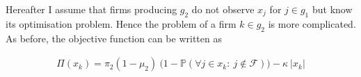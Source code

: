 \documentclass[american, abstract=on]{scrartcl}
\newcommand{\F}{\mathcal{F}}
\renewcommand{\P}{\mathbb{P}}
\newcommand{\abs}[1]{\left\lvert#1\right\rvert}
\begin{document}
Hereafter I assume that firms producing $g_2$ do not observe $x_j$ for $j \in g_1$ but know its optimisation problem. Hence the problem of a firm $k \in g_2$ is more complicated. As before, the objective function can be written as 

\begin{equation}
  \begin{split}
    \Pi(x_k) = \pi_2 (1 - \mu_2) \  \Big(1 - \P\left(\forall j \in x_k: \ j \notin \F \right) \Big) - \kappa \ \abs{x_k}
  \end{split}
\end{equation}

\newpage
\nocite{*}
\printbibliography
\end{document}
